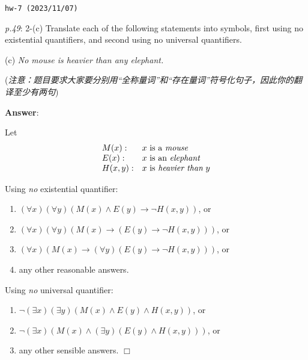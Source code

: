 \documentclass[UTF8,12pt,a4paper]{ctexart}
\begin{document}
\noindent\texttt{hw-7 (2023/11/07)}

\emph{p.49}: 2-(c) \quad
Translate each of the following statements into symbols, {\color{purple} first} using no existential quantifiers, and {\color{purple} second} using no universal quantifiers. 

\qquad (c) \hspace{3cm}  \textit{No mouse is heavier than any elephant.}

(\textit{注意：题目要求大家要分别用“全称量词”和“存在量词”符号化句子，因此你的翻译至少有两句})

\noindent\textbf{Answer}:   

Let 
\[\begin{array}{l l l}
	M(x):& x \text{ is a \textit{mouse}}\\
	E(x): & x \text{ is an \textit{elephant}}\\
	H(x,y): & x \text{ is \textit{heavier than}\;} y \\
\end{array}\]

Using \textit{no} existential quantifier: 
\begin{enumerate}
	\item $(\forall x) (\forall y) (M(x) \land E(y) \to \neg H(x,y))$, or
	
	\item $(\forall x) (\forall y) (M(x) \to (E(y) \to \neg H(x,y)))$, or
	
	\item $(\forall x)  (M(x) \to (\forall y) (E(y) \to \neg H(x,y)))$, or
	
	\item any other reasonable answers.
\end{enumerate}

\vspace{1em}

Using \textit{no} universal quantifier:
\begin{enumerate}
	\item $\neg (\exists x) (\exists y) (M(x) \land E(y) \land H(x,y))$, or
	
	\item $\neg (\exists x)  (M(x) \land (\exists y) (E(y) \land H(x,y)))$, or
	
	\item any other sensible answers. 
	\hfill $\Box$
\end{enumerate}



\vspace{1em}
\end{document}
